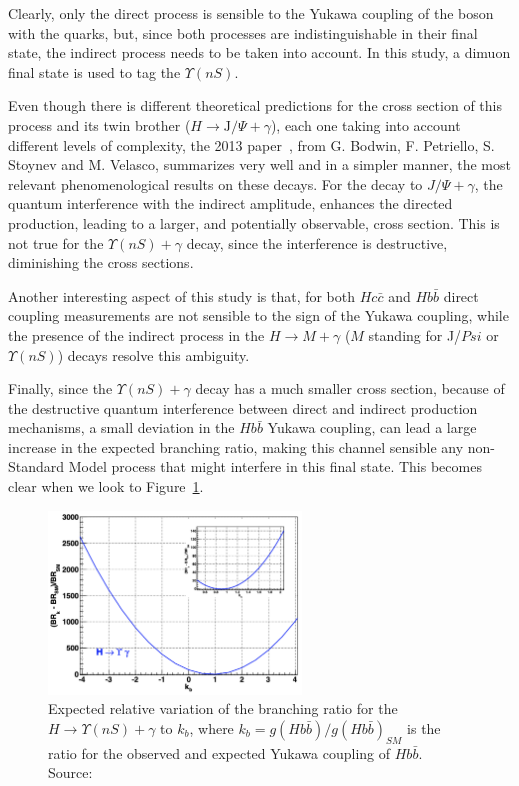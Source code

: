 Clearly, only the direct process is sensible to the Yukawa coupling of the boson with the quarks, but, since both processes are indistinguishable in their final state, the indirect process needs to be taken into account. In this study, a dimuon final state is used to tag the $\Upsilon(nS)$.

Even though there is different theoretical predictions for the cross section of this process and its twin brother ($H \rightarrow \text{J/}\Psi + \gamma$), each one taking into account different levels of complexity, the 2013 paper~\cite{PhysRevD.88.053003}, from G. Bodwin, F. Petriello, S. Stoynev and M. Velasco, summarizes very well and in a simpler manner, the most relevant phenomenological results on these decays. For the decay to $J/\Psi + \gamma$, the quantum interference with the indirect amplitude, enhances the directed production, leading to a larger, and potentially observable, cross section. This is not true for the $\Upsilon(nS) + \gamma$ decay, since the interference is destructive, diminishing the cross sections. 

Another interesting aspect of this study is that, for both $Hc\bar{c}$ and $Hb\bar{b}$ direct coupling measurements are not sensible to the sign of the Yukawa coupling, while the presence of the indirect process in the $H \rightarrow M + \gamma$ ($M$ standing for J/$Psi$ or $\Upsilon(nS)$) decays resolve this ambiguity.

Finally, since the $\Upsilon(nS) + \gamma$ decay has a much smaller cross section, because of the destructive quantum interference between direct and indirect production mechanisms, a small deviation in the $Hb\bar{b}$ Yukawa coupling, can lead a large increase in the expected branching ratio, making this channel sensible any non-Standard Model process that might interfere in this final state. This becomes clear when we look to Figure~\ref{hbb_coup}.

\begin{figure}[!htbp]
  \begin{center}
    \includegraphics[width=0.6\textwidth ]{figures_and_tables/theory/hbb_coup.png}
  \end{center}\vspace*{-.5cm}
  \caption{Expected relative variation of the branching ratio for the $H \rightarrow \Upsilon(nS) + \gamma$ to $k_b$, where $k_b = g(Hb\bar{b})/g(Hb\bar{b})_{SM}$ is the ratio for the observed and expected Yukawa coupling of $Hb\bar{b}$. Source:~\cite{PhysRevD.88.053003}}
  \label{hbb_coup}
\end{figure}


